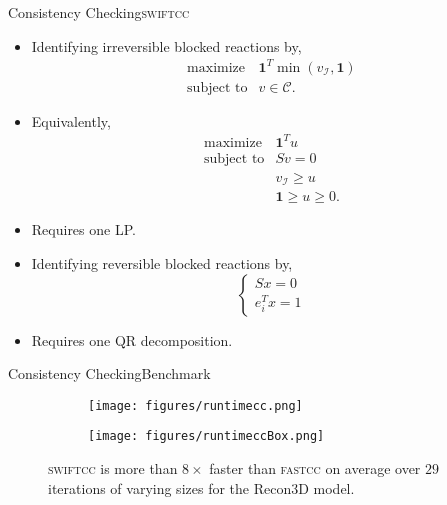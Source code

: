 \documentclass[10pt]{beamer}
\newcommand{\ones}{\mathbf 1}
\theoremstyle{remark}
\theoremstyle{definition}
\begin{document}
\begin{frame}{Consistency Checking}{\textsc{swiftcc}}
\noindent
\begin{minipage}[t]{.49\textwidth}
\raggedright
\begin{itemize}
  \item<1-> Identifying irreversible blocked reactions by,
  \[
	\begin{array}{ll}
	\mbox{maximize}		& \ones^T\min(v_\mathcal{I},\ones) \\
	\mbox{subject to}	& v \in \mathcal{C}.
	\end{array}
  \]\pause
  \item<2-> Equivalently,
  \[
	\begin{array}{ll}
	\mbox{maximize}		& \ones^T u \\
	\mbox{subject to}	& S v = 0\\
						& v_\mathcal{I} \geq u\\
						& \ones \geq u \geq 0.
  \end{array}
  \]
  \item<3-> Requires one LP. 
\end{itemize}
\end{minipage}
\hfill
\begin{minipage}[t]{.49\textwidth}
\raggedleft
\begin{itemize}
  \item<4-> Identifying reversible blocked reactions by,
  \[
	\begin{cases}
	Sx=0 \\
	e_i^T x = 1
    \end{cases}
  \]
  \item<5-> Requires one QR decomposition.  
\end{itemize}
\end{minipage}
  
\end{frame}

\begin{frame}{Consistency Checking}{Benchmark}
    \begin{figure}[ht]
    \centering
    \begin{subfigure}[b]{0.45\textwidth}
        \texttt{[image: figures/runtimecc.png]}
    \end{subfigure}
    \qquad
    \begin{subfigure}[b]{0.45\textwidth}
        \texttt{[image: figures/runtimeccBox.png]}
    \end{subfigure}
    \caption{\textsc{swiftcc} is more than $8\times$ faster than \textsc{fastcc} on average 
    over $29$ iterations of varying sizes for the Recon3D model.}
	\end{figure}

\end{frame}
\end{document}
